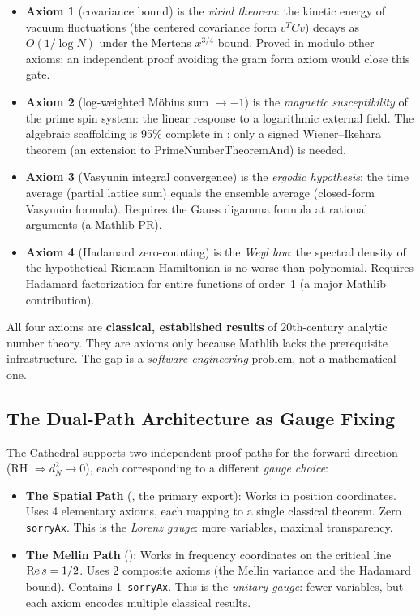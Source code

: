 \documentclass[11pt,a4paper]{article}
\begin{document}
\begin{remark}
\begin{itemize}
  \item \textbf{Axiom 1} (covariance bound) is the \emph{virial theorem}:
    the kinetic energy of vacuum fluctuations (the centered covariance
    form $v^T C v$) decays as $O(1/\log N)$ under the Mertens $x^{3/4}$
    bound. Proved in  modulo other axioms;
    an independent proof avoiding the gram form axiom would close this gate.
  \item \textbf{Axiom 2} (log-weighted M\"obius sum $\to -1$) is the
    \emph{magnetic susceptibility} of the prime spin system: the linear
    response to a logarithmic external field. The algebraic scaffolding
    is 95\% complete in ; only a signed
    Wiener--Ikehara theorem (an extension to PrimeNumberTheoremAnd)
    is needed.
  \item \textbf{Axiom 3} (Vasyunin integral convergence) is the
    \emph{ergodic hypothesis}: the time average (partial lattice sum)
    equals the ensemble average (closed-form Vasyunin formula).
    Requires the Gauss digamma formula at rational arguments
    (a Mathlib PR).
  \item \textbf{Axiom 4} (Hadamard zero-counting) is the \emph{Weyl law}:
    the spectral density of the hypothetical Riemann Hamiltonian is no
    worse than polynomial. Requires Hadamard factorization for entire
    functions of order~1 (a major Mathlib contribution).
\end{itemize}
All four axioms are \textbf{classical, established results} of 20th-century
analytic number theory. They are axioms only because Mathlib lacks the
prerequisite infrastructure. The gap is a \emph{software engineering}
problem, not a mathematical one.
\end{remark}

\subsection{The Dual-Path Architecture as Gauge Fixing}

The Cathedral supports two independent proof paths for the forward
direction (RH $\Rightarrow d_N^2 \to 0$), each corresponding to a
different \emph{gauge choice}:

\begin{itemize}
  \item \textbf{The Spatial Path} (,
    the primary export): Works in position coordinates. Uses 4 elementary
    axioms, each mapping to a single classical theorem. Zero \texttt{sorryAx}.
    This is the \emph{Lorenz gauge}: more variables, maximal transparency.

  \item \textbf{The Mellin Path} ():
    Works in frequency coordinates on the critical line $\operatorname{Re} s = 1/2$.
    Uses 2 composite axioms (the Mellin variance and the Hadamard bound).
    Contains 1~\texttt{sorryAx}. This is the \emph{unitary gauge}: fewer
    variables, but each axiom encodes multiple classical results.
\end{itemize}
\end{document}
